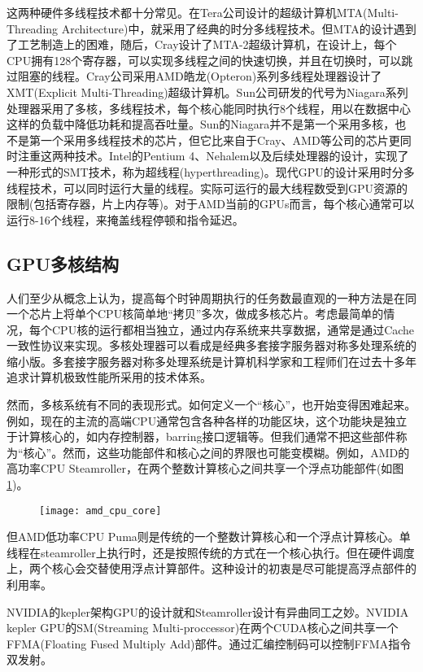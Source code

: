 这两种硬件多线程技术都十分常见。在Tera公司设计的超级计算机MTA(Multi-Threading Architecture)中，就采用了经典的时分多线程技术。但MTA的设计遇到了工艺制造上的困难，随后，Cray设计了MTA-2超级计算机，在设计上，每个CPU拥有128个寄存器，可以实现多线程之间的快速切换，并且在切换时，可以跳过阻塞的线程。Cray公司采用AMD皓龙(Opteron)系列多线程处理器设计了XMT(Explicit Multi-Threading)超级计算机。Sun公司研发的代号为Niagara系列处理器采用了多核，多线程技术，每个核心能同时执行8个线程，用以在数据中心这样的负载中降低功耗和提高吞吐量。Sun的Niagara并不是第一个采用多核，也不是第一个采用多线程技术的芯片，但它比来自于Cray、AMD等公司的芯片更同时注重这两种技术。Intel的Pentium 4、Nehalem以及后续处理器的设计，实现了一种形式的SMT技术，称为超线程(hyperthreading)。现代GPU的设计采用时分多线程技术，可以同时运行大量的线程。实际可运行的最大线程数受到GPU资源的限制(包括寄存器，片上内存等)。对于AMD当前的GPUs而言，每个核心通常可以运行8-16个线程，来掩盖线程停顿和指令延迟。

\subsection{GPU多核结构}
人们至少从概念上认为，提高每个时钟周期执行的任务数最直观的一种方法是在同一个芯片上将单个CPU核简单地“拷贝”多次，做成多核芯片。考虑最简单的情况，每个CPU核的运行都相当独立，通过内存系统来共享数据，通常是通过Cache一致性协议来实现。多核处理器可以看成是经典多套接字服务器对称多处理系统的缩小版。多套接字服务器对称多处理系统是计算机科学家和工程师们在过去十多年追求计算机极致性能所采用的技术体系。

然而，多核系统有不同的表现形式。如何定义一个“核心”，也开始变得困难起来。例如，现在的主流的高端CPU通常包含各种各样的功能区块，这个功能块是独立于计算核心的，如内存控制器，barring接口逻辑等。但我们通常不把这些部件称为“核心”。然而，这些功能部件和核心之间的界限也可能变模糊。例如，AMD的高功率CPU Steamroller，在两个整数计算核心之间共享一个浮点功能部件(如图\ref{fig:amd_cpu_core})。
\begin{figure}[htbp]
	\centering
	\texttt{[image: amd\_cpu\_core]}
	\label{fig:amd_cpu_core}
\end{figure}

但AMD低功率CPU Puma则是传统的一个整数计算核心和一个浮点计算核心。单线程在steamroller上执行时，还是按照传统的方式在一个核心执行。但在硬件调度上，两个核心会交替使用浮点计算部件。这种设计的初衷是尽可能提高浮点部件的利用率。

NVIDIA的kepler架构GPU的设计就和Steamroller设计有异曲同工之妙。NVIDIA kepler GPU的SM(Streaming Multi-proccessor)在两个CUDA核心之间共享一个FFMA(Floating Fused Multiply Add)部件。通过汇编控制码可以控制FFMA指令双发射。

